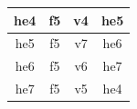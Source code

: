 \begin{figure}[h]
\begin{minipage}[hb]{0.25\linewidth}
\begin{tabular}{|c|c|c|c|}
\hline
\textsf{he4} & \textsf{f5} & \textsf{v4} & \textsf{he5}\\
\hline
\textsf{he5} & \textsf{f5} & \textsf{v7} & \textsf{he6}\\
\hline
\textsf{he6} & \textsf{f5} & \textsf{v6} & \textsf{he7}\\
\hline
\textsf{he7} & \textsf{f5} & \textsf{v5} & \textsf{he4}\\
\hline
\end{tabular}
\label{fig:figure2}
\end{minipage}

\end{figure}
